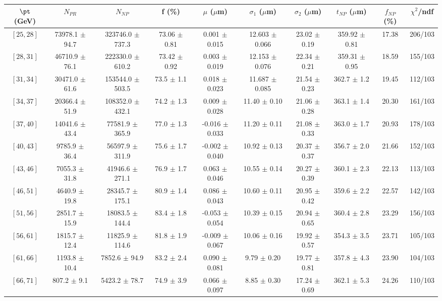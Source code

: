\begin{tabular}{c||c|c|c|c|c|c|c||c|c}
$\pt$ (GeV) & $N_{PR}$ & $N_{NP}$ & f (\%) & $\mu$ ($\mu$m) & $\sigma_1$ ($\mu$m) & $\sigma_2$ ($\mu$m)  & $t_{NP}$ ($\mu$m) & $f_{NP}$ (\%) & $\chi^2$/ndf \\
\hline
$[25, 28]$ & 73978.1 $\pm$ 94.7 & 323746.0 $\pm$ 737.3 & 73.06 $\pm$ 0.81 & 0.001 $\pm$ 0.015 & 12.603 $\pm$ 0.066 & 23.02 $\pm$ 0.19 & 359.92 $\pm$ 0.81 & 17.38 & 206/103\\
$[28, 31]$ & 46710.9 $\pm$ 76.1 & 222330.0 $\pm$ 610.2 & 73.42 $\pm$ 0.92 & 0.003 $\pm$ 0.019 & 12.153 $\pm$ 0.076 & 22.34 $\pm$ 0.21 & 359.31 $\pm$ 0.95 & 18.59 & 155/103\\
$[31, 34]$ & 30471.0 $\pm$ 61.6 & 153544.0 $\pm$ 503.5 & 73.5 $\pm$ 1.1 & 0.018 $\pm$ 0.023 & 11.687 $\pm$ 0.085 & 21.54 $\pm$ 0.23 & 362.7 $\pm$ 1.2 & 19.45 & 112/103\\
$[34, 37]$ & 20366.4 $\pm$ 51.9 & 108352.0 $\pm$ 432.1 & 74.2 $\pm$ 1.3 & 0.009 $\pm$ 0.028 & 11.40 $\pm$ 0.10 & 21.06 $\pm$ 0.28 & 363.1 $\pm$ 1.4 & 20.30 & 161/103\\
$[37, 40]$ & 14041.6 $\pm$ 43.4 & 77581.9 $\pm$ 365.9 & 77.0 $\pm$ 1.3 & -0.016 $\pm$ 0.033 & 11.20 $\pm$ 0.11 & 21.08 $\pm$ 0.33 & 363.0 $\pm$ 1.7 & 20.93 & 178/103\\
$[40, 43]$ & 9785.9 $\pm$ 36.4 & 56597.9 $\pm$ 311.9 & 75.6 $\pm$ 1.7 & -0.002 $\pm$ 0.040 & 10.92 $\pm$ 0.13 & 20.37 $\pm$ 0.37 & 356.7 $\pm$ 2.0 & 21.66 & 152/103\\
$[43, 46]$ & 7055.3 $\pm$ 31.8 & 41946.6 $\pm$ 271.1 & 76.9 $\pm$ 1.7 & 0.063 $\pm$ 0.046 & 10.55 $\pm$ 0.14 & 20.27 $\pm$ 0.39 & 360.1 $\pm$ 2.3 & 22.13 & 113/103\\
$[46, 51]$ & 4640.9 $\pm$ 19.8 & 28345.7 $\pm$ 175.1 & 80.9 $\pm$ 1.4 & 0.086 $\pm$ 0.043 & 10.60 $\pm$ 0.11 & 20.95 $\pm$ 0.42 & 359.6 $\pm$ 2.2 & 22.57 & 142/103\\
$[51, 56]$ & 2851.7 $\pm$ 15.9 & 18083.5 $\pm$ 144.4 & 83.4 $\pm$ 1.8 & -0.053 $\pm$ 0.054 & 10.39 $\pm$ 0.15 & 20.94 $\pm$ 0.65 & 360.4 $\pm$ 2.8 & 23.29 & 156/103\\
$[56, 61]$ & 1815.7 $\pm$ 12.4 & 11825.9 $\pm$ 114.6 & 81.8 $\pm$ 1.9 & -0.009 $\pm$ 0.067 & 10.06 $\pm$ 0.16 & 19.92 $\pm$ 0.57 & 354.3 $\pm$ 3.5 & 23.71 & 105/103\\
$[61, 66]$ & 1193.8 $\pm$ 10.4 & 7852.6 $\pm$ 94.9 & 83.2 $\pm$ 2.4 & 0.090 $\pm$ 0.081 & 9.79 $\pm$ 0.20 & 19.77 $\pm$ 0.81 & 357.8 $\pm$ 4.3 & 23.90 & 104/103\\
$[66, 71]$ & 807.2 $\pm$ 9.1 & 5423.2 $\pm$ 78.7 & 74.9 $\pm$ 3.9 & 0.066 $\pm$ 0.097 & 8.85 $\pm$ 0.30 & 17.24 $\pm$ 0.69 & 362.1 $\pm$ 5.3 & 24.26 & 110/103\\

\end{tabular}
